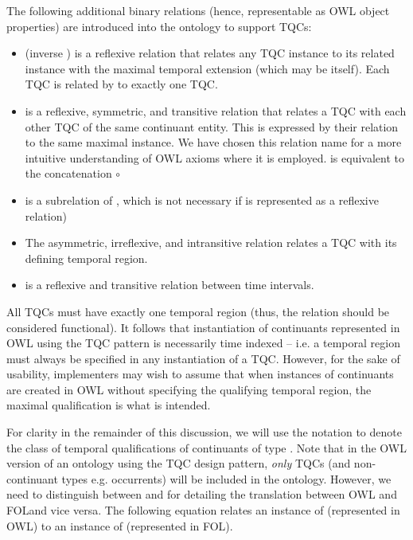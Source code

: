 The following additional binary relations (hence, representable as OWL object properties) 
are introduced into the ontology to support 
TQCs:
\begin{itemize}
    \item {} (inverse ) is a reflexive relation that relates any TQC instance to its related instance 
    with the maximal temporal extension (which may be itself). Each TQC is related by  to exactly one TQC. 
    \item {} is a reflexive, symmetric, and transitive relation that relates a TQC with each other TQC of the same continuant entity. This is 
    expressed by their relation to the same maximal instance. We have
    chosen this relation name for a more intuitive understanding of OWL axioms where it is employed. 
      is equivalent to the concatenation  $\circ$ 
    \item {} is a subrelation of , which is not necessary if  is represented as a 
    reflexive relation)
    \item The asymmetric, irreflexive, and intransitive relation  relates a TQC with its defining temporal region.
    \item {} is a reflexive and transitive relation between time intervals.
\end{itemize}

All TQCs must have exactly one temporal region (thus, the  relation should be
considered functional). It follows that instantiation of continuants represented in OWL using 
the TQC pattern is necessarily time indexed -- i.e. a temporal region must always be specified 
in any instantiation of a TQC. However, for the sake of usability, implementers may wish to assume  
that when instances of continuants are created in OWL without specifying the qualifying temporal region, the maximal qualification is what is intended. 

For clarity in the remainder of this discussion, we will use the notation  to denote the class of temporal qualifications of
continuants of type . Note that in the OWL version of an ontology using the TQC design pattern, \emph{only} TQCs (and non-continuant types e.g. occurrents) will be included in the ontology. However, we need to distinguish between  and  for detailing the translation between OWL and FOLand vice versa. The following equation relates an instance of  (represented in OWL) to an instance of  (represented in FOL). 

